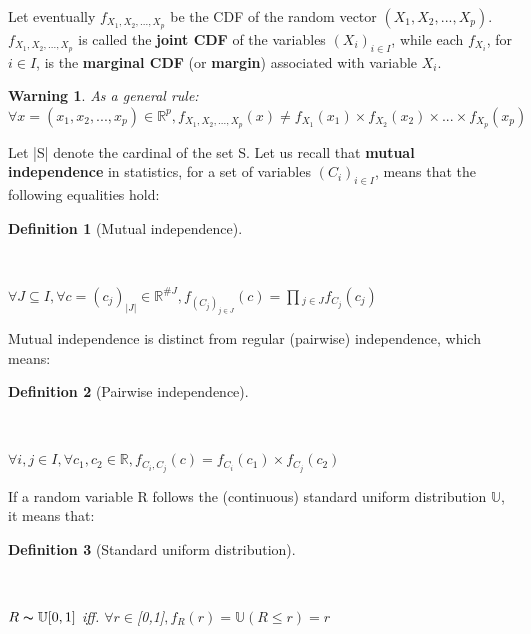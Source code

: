 \documentclass{report}
\newtheorem{definition}{Definition}[section]
\newtheorem{warning}{Warning}[section]
\begin{document}
Let eventually $f_{X_1, X_2, ..., X_p}$ be the CDF of the random vector $(X_1, X_2, ..., X_p)$. $f_{X_1, X_2, ..., X_p}$ is called the \textbf{joint CDF} of the variables $(X_i)_{i \in I}$, while each $f_{X_i}$, for $i \in I$, is the \textbf{marginal CDF} (or \textbf{margin}) associated with variable $X_i$.

\begin{warning}{As a general rule:\\$\forall x = (x_1, x_2, ..., x_p) \in \mathbb{R}^p, f_{X_1, X_2, ..., X_p}(x) \neq f_{X_1}(x_1) \times f_{X_2}(x_2) \times ... \times f_{X_p}(x_p)$}\end{warning}

Let |S| denote the cardinal of the set S. Let us recall that \textbf{mutual independence} in statistics, for a set of variables $(C_i)_{i \in I}$, means that the following equalities hold:

\begin{definition}[Mutual independence]\label{mutualindependence}{~ \\ \begin{center}$\forall J \subseteq I, \forall c = (c_j)_{|J|} \in \mathbb{R}^{\#J}, f_{(C_j)_{j \in J}}(c) = \prod{_{j \in J}}{f_{C_j}(c_j)}$\end{center}}\end{definition}

Mutual independence is distinct from regular (pairwise) independence, which means:

\begin{definition}[Pairwise independence]\label{independence}{~ \\\begin{center}$\forall i, j \in I, \forall c_1, c_2 \in \mathbb{R}, f_{C_i, C_j}(c) = f_{C_i}(c_1) \times f_{C_j}(c_2)$\end{center}}\end{definition}

If a random variable R follows the (continuous) standard uniform distribution $\mathbb{U}$, it means that:

\begin{definition}[Standard uniform distribution]\label{standarduniform}{~ \\\begin{center}$R \thicksim \mathbb{U}[0,1]$ iff. $\forall r \in $[0,1]$, f_{R}(r) = \mathbb{U}(R \leq r) = r$\end{center}}\end{definition}
\end{document}
